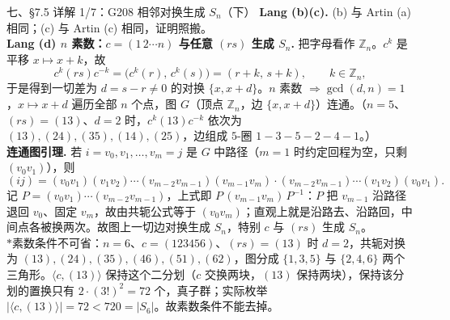 \documentclass[aspectratio=169,10pt,fontset=none]{ctexbeamer}
\newcommand{\key}[1]{\textcolor{ink}{\bfseries #1}}
\newcommand{\starpt}{\textcolor{accent}{\bfseries$\ast$}}
\begin{document}
\begin{frame}[t]{七、\S7.5 详解 1/7：G208 相邻对换生成 $S_n$（下）}
\scriptsize
\setlength{\parskip}{1pt}
\key{Lang (b)(c).} (b) 与 Artin (a) 相同；(c) 与 Artin (c) 相同，证明照搬。\\
\key{Lang (d) $n$ 素数：$c=(1\,2\cdots n)$ 与任意 $(rs)$ 生成 $S_n$.} 把字母看作 $\mathbb Z_n$。$c^k$ 是平移 $x\mapsto x+k$，故
\[ c^k(rs)c^{-k}=\bigl(c^k(r),\,c^k(s)\bigr)=(r+k,\,s+k),\qquad k\in\mathbb Z_n, \]
于是得到一切差为 $d=s-r\ne0$ 的对换 $\{x,x+d\}$。$n$ 素数 $\Rightarrow\gcd(d,n)=1$，$x\mapsto x+d$ 遍历全部 $n$ 个点，图 $G$（顶点 $\mathbb Z_n$，边 $\{x,x+d\}$）连通。（$n=5$、$(rs)=(13)$、$d=2$ 时，$c^k(13)c^{-k}$ 依次为 $(13),(24),(35),(14),(25)$，边组成 $5$-圈 $1-3-5-2-4-1$。）\\
\key{连通图引理.} 若 $i=v_0,v_1,\ldots,v_m=j$ 是 $G$ 中路径（$m=1$ 时约定回程为空，只剩 $(v_0v_1)$），则
\[
(ij)=(v_0v_1)(v_1v_2)\cdots(v_{m-2}v_{m-1})(v_{m-1}v_m)
\cdot(v_{m-2}v_{m-1})\cdots(v_1v_2)(v_0v_1).
\]
记 $P=(v_0v_1)\cdots(v_{m-2}v_{m-1})$，上式即 $P\,(v_{m-1}v_m)\,P^{-1}$：$P$ 把 $v_{m-1}$ 沿路径退回 $v_0$、固定 $v_m$，故由共轭公式等于 $(v_0v_m)$；直观上就是沿路去、沿路回，中间点各被换两次。故图上一切边对换生成 $S_n$，特别 $c$ 与 $(rs)$ 生成 $S_n$。\\
\starpt 素数条件不可省：$n=6$、$c=(123456)$、$(rs)=(13)$ 时 $d=2$，共轭对换为 $(13),(24),(35),(46),(51),(62)$，图分成 $\{1,3,5\}$ 与 $\{2,4,6\}$ 两个三角形。$\langle c,(13)\rangle$ 保持这个二分划（$c$ 交换两块，$(13)$ 保持两块），保持该分划的置换只有 $2\cdot(3!)^2=72$ 个，真子群；实际枚举 $|\langle c,(13)\rangle|=72<720=|S_6|$。故素数条件不能去掉。
\end{frame}
\end{document}
